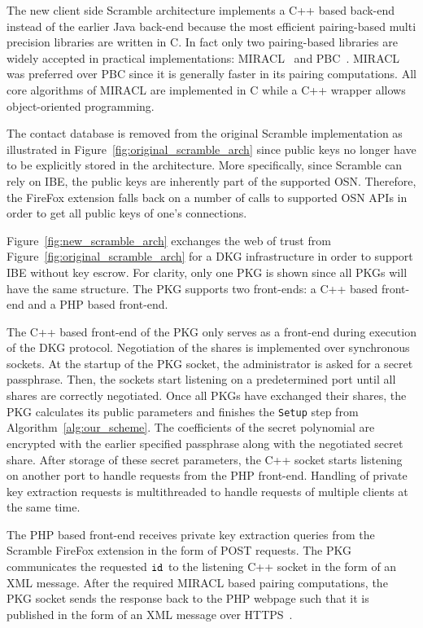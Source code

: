 The new client side Scramble architecture implements a C++ based back-end instead of the earlier Java back-end because the most efficient pairing-based multi precision libraries are written in C. In fact only two pairing-based libraries are widely accepted in practical implementations: MIRACL~\cite{art:Scott03} and PBC~\cite{thesis:Lynn07}. MIRACL was preferred over PBC since it is generally faster in its pairing computations. All core algorithms of MIRACL are implemented in C while a C++ wrapper allows object-oriented programming.

The contact database is removed from the original Scramble implementation as illustrated in Figure~\ref{fig:original_scramble_arch} since public keys no longer have to be explicitly stored in the architecture. More specifically, since Scramble can rely on IBE, the public keys are inherently part of the supported OSN. Therefore, the FireFox extension falls back on a number of calls to supported OSN APIs in order to get all public keys of one's connections.

Figure~\ref{fig:new_scramble_arch} exchanges the web of trust from Figure~\ref{fig:original_scramble_arch} for a DKG infrastructure in order to support IBE without key escrow. For clarity, only one PKG is shown since all PKGs will have the same structure. The PKG supports two front-ends: a C++ based front-end and a PHP based front-end. 

The C++ based front-end of the PKG only serves as a front-end during execution of the DKG protocol. Negotiation of the shares is implemented over synchronous sockets. At the startup of the PKG socket, the administrator is asked for a secret passphrase. Then, the sockets start listening on a predetermined port until all shares are correctly negotiated. Once all PKGs have exchanged their shares, the PKG calculates its public parameters and finishes the \texttt{Setup} step from Algorithm~\ref{alg:our_scheme}. The coefficients of the secret polynomial are encrypted with the earlier specified passphrase along with the negotiated secret share. After storage of these secret parameters, the C++ socket starts listening on another port to handle requests from the PHP front-end. Handling of private key extraction requests is multithreaded to handle requests of multiple clients at the same time.

The PHP based front-end receives private key extraction queries from the Scramble FireFox extension in the form of POST requests. The PKG communicates the requested $\mathtt{id}_{}$ to the listening C++ socket in the form of an XML message. After the required MIRACL based pairing computations, the PKG socket sends the response back to the PHP webpage such that it is published in the form of an XML message over HTTPS~\cite{rfc2818}.

